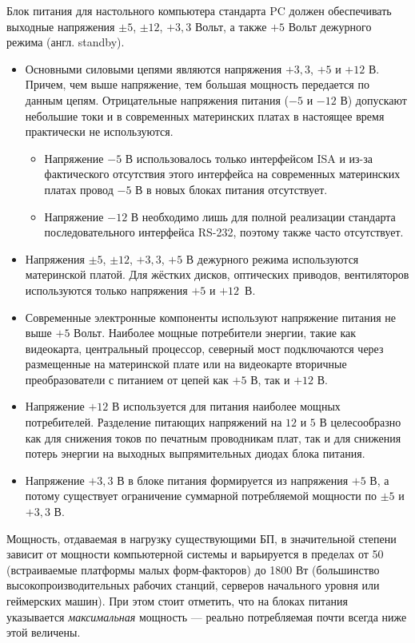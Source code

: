 Блок питания для настольного компьютера стандарта PC должен обеспечивать выходные напряжения $\pm 5$, $\pm 12$, $+3,3$ Вольт, а также $+5$ Вольт дежурного режима (англ. standby).
\begin{itemize}
 \item Основными силовыми цепями являются напряжения $+3,3$, $+5$ и $+12$ В. Причем, чем выше напряжение, тем большая мощность передается по данным цепям. Отрицательные напряжения питания ($−5$ и $−12$ В) допускают небольшие токи и в современных материнских платах в настоящее время практически не используются. 
 \begin{itemize}
  \item Напряжение $−5$ В использовалось только интерфейсом ISA и из-за фактического отсутствия этого интерфейса на современных материнских платах провод $−5$ В в новых блоках питания отсутствует.
  \item Напряжение $−12$ В необходимо лишь для полной реализации стандарта последовательного интерфейса RS-232, поэтому также часто отсутствует.
 \end{itemize}
 \item Напряжения $\pm 5$, $\pm 12$, $+3,3$, $+5$ В дежурного режима используются материнской платой. Для жёстких дисков, оптических приводов, вентиляторов используются только напряжения $+5$ и $+12$~В.
 \item Современные электронные компоненты используют напряжение питания не выше $+5$ Вольт. Наиболее мощные потребители энергии, такие как видеокарта, центральный процессор, северный мост подключаются через размещенные на материнской плате или на видеокарте вторичные преобразователи с питанием от цепей как $+5$ В, так и $+12$ В.
 \item Напряжение $+12$ В используется для питания наиболее мощных потребителей. Разделение питающих напряжений на $12$ и $5$ В целесообразно как для снижения токов по печатным проводникам плат, так и для снижения потерь энергии на выходных выпрямительных диодах блока питания.
 \item Напряжение $+3,3$ В в блоке питания формируется из напряжения $+5$ В, а потому существует ограничение суммарной потребляемой мощности по $\pm 5$ и $+3,3$ В.
\end{itemize}

Мощность, отдаваемая в нагрузку существующими БП, в значительной степени зависит от мощности компьютерной системы и варьируется в пределах от 50 (встраиваемые платформы малых форм-факторов) до 1800 Вт (большинство высокопроизводительных рабочих станций, серверов начального уровня или геймерских машин).
При этом стоит отметить, что на блоках питания указывается \emph{максимальная} мощность --- реально потребляемая почти всегда ниже этой величены.

